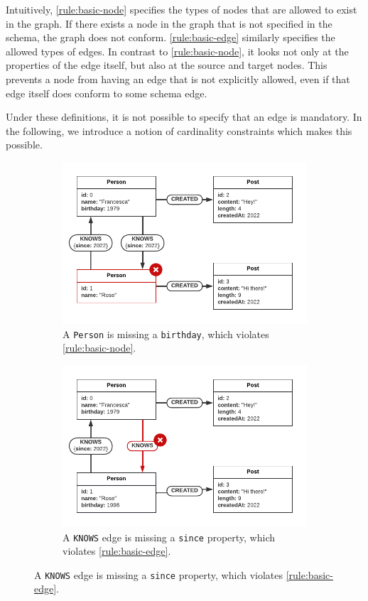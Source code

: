 \documentclass{report}
\theoremstyle{definition}
\begin{document}
Intuitively, \autoref{rule:basic-node} specifies the types of nodes that are allowed to exist in the graph. If there exists a node in the graph that is not specified in the schema, the graph does not conform. \autoref{rule:basic-edge} similarly specifies the allowed types of edges. In contrast to \autoref{rule:basic-node}, it looks not only at the properties of the edge itself, but also at the source and target nodes. This prevents a node from having an edge that is not explicitly allowed, even if that edge itself does conform to some schema edge.

Under these definitions, it is not possible to specify that an edge is mandatory. In the following, we introduce a notion of cardinality constraints which makes this possible.

\begin{figure}[t]
  \centering
  \begin{subfigure}[t]{0.45\textwidth}
    \centering
    \includegraphics[width=\textwidth]{figures/conformance-basic-node.pdf}
    \caption{A \texttt{Person} is missing a \texttt{birthday}, which violates \autoref{rule:basic-node}.}
    \label{fig:conformance-basic-node}
  \end{subfigure}
  \hfill
  \begin{subfigure}[t]{0.45\textwidth}
    \centering
    \includegraphics[width=\textwidth]{figures/conformance-basic-edge.pdf}
    \caption{A \texttt{KNOWS} edge is missing a \texttt{since} property, which violates \autoref{rule:basic-edge}.}
    \label{fig:conformance-basic-edge}
  \end{subfigure}


\end{figure}
\end{document}

